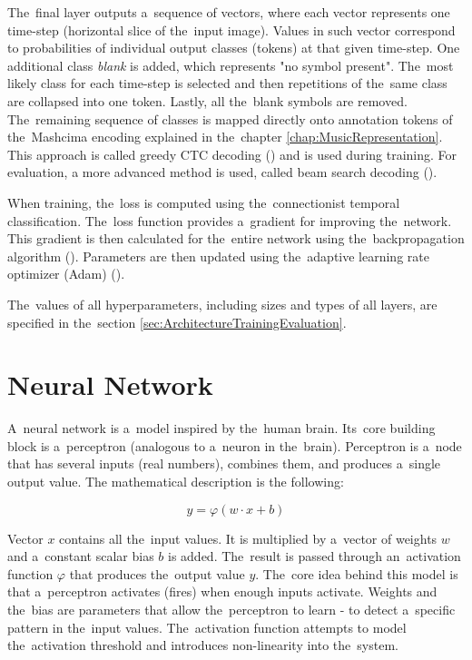 The~final layer outputs a~sequence of vectors, where each vector represents one time-step (horizontal slice of the~input image). Values in such vector correspond to probabilities of individual output classes (tokens) at that given time-step. One additional class \emph{blank} is added, which represents "no symbol present". The~most likely class for each time-step is selected and then repetitions of the~same class are collapsed into one token. Lastly, all the~blank symbols are removed. The~remaining sequence of classes is mapped directly onto annotation tokens of the~Mashcima encoding explained in the~chapter \ref{chap:MusicRepresentation}. This approach is called greedy CTC decoding (\cite{CTC}) and is used during training. For evaluation, a more advanced method is used, called beam search decoding (\cite{CtcBeamSearch}).

When training, the~loss is computed using the~connectionist temporal classification. The~loss function provides a~gradient for improving the~network. This gradient is then calculated for the~entire network using the~backpropagation algorithm (\cite{Goodfellow-et-al-2016}). Parameters are then updated using the~adaptive learning rate optimizer (Adam) (\cite{AdamOptimizer}).

The~values of all hyperparameters, including sizes and types of all layers, are specified in the~section \ref{sec:ArchitectureTrainingEvaluation}.


\section{Neural Network}

A~neural network is a~model inspired by the~human brain. Its~core building block is a~perceptron (analogous to a~neuron in the~brain). Perceptron is a~node that has several inputs (real numbers), combines them, and produces a~single output value. The mathematical description is the following:

$$
    y = \varphi(w \cdot x + b)
$$

Vector $x$ contains all the~input values. It is multiplied by a~vector of weights $w$ and a~constant scalar bias $b$ is added. The~result is passed through an~activation function $\varphi$ that produces the~output value $y$. The~core idea behind this model is that a~perceptron activates (fires) when enough inputs activate. Weights and the~bias are parameters that allow the~perceptron to learn - to detect a~specific pattern in the~input values. The~activation function attempts to model the~activation threshold and introduces non-linearity into the~system.

